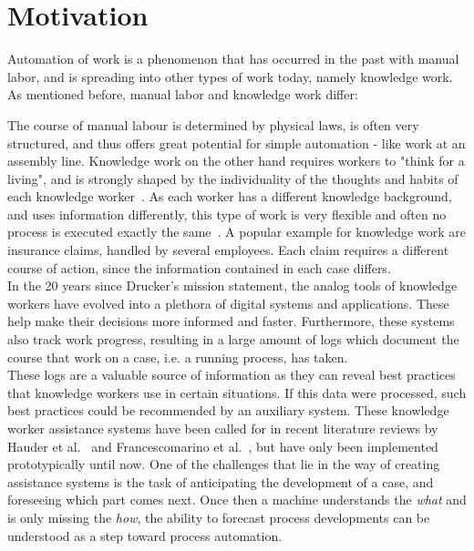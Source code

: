 \section{Motivation} \label{sec:intro:motivation}
Automation of work is a phenomenon that has occurred in the past with manual labor, and is spreading into other types of work today, namely knowledge work. As mentioned before, manual labor and knowledge work differ:

The course of manual labour is determined by physical laws, is often very structured, and thus offers great potential for simple automation - like work at an assembly line. Knowledge work on the other hand requires workers to "think for a living", and is strongly shaped by the individuality of the thoughts and habits of each knowledge worker~\cite{drucker1999}. As each worker has a different knowledge background, and uses information differently, this type of work is very flexible and often no process is executed exactly the same~\cite{hewelt2016}. A popular example for knowledge work are insurance claims, handled by several employees. Each claim requires a different course of action, since the information contained in each case differs.\\

In the 20 years since Drucker's mission statement, the analog tools of knowledge workers have evolved into a plethora of digital systems and applications. These help make their decisions more informed and faster. Furthermore, these systems also track work progress, resulting in a large amount of logs which document the course that work on a case, i.e. a running process, has taken.\\

These logs are a valuable source of information as they can reveal best practices that knowledge workers use in certain situations. If this data were processed, such best practices could be recommended by an auxiliary system. These knowledge worker assistance systems have been called for in recent literature reviews by Hauder et al.~\cite{hauder2014} and Francescomarino et al.~\cite{francescomarino2018}, but have only been implemented prototypically until now. One of the challenges that lie in the way of creating assistance systems is the task of anticipating the development of a case, and foreseeing which part comes next. Once then a machine understands the \textit{what} and is only missing the \textit{how}, the ability to forecast process developments can be understood as a step toward process automation.\\

